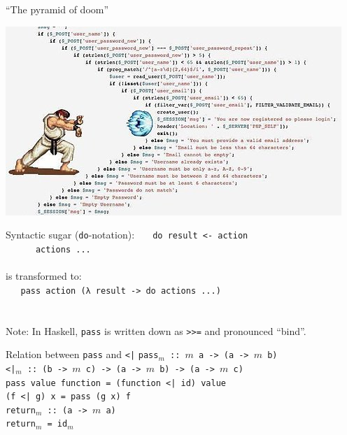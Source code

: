 \documentclass{beamer}
\begin{document}
\begin{frame}{``The pyramid of doom''}
  \begin{center}
    \includegraphics[height=0.7\paperheight]{ryu.jpg}
  \end{center}
\end{frame}


\begin{frame}{Syntactic sugar (\texttt{do}-notation):}
  \texttt{
    \ \ do result <- action \\
    \ \ \ \ \ \ actions  ... \\
  } \ \\ \pause
  is transformed to: \\ \pause
  \texttt{
    \ \ pass action (λ result -> do actions ...) \\
  } \ \\  \pause
  \ \\
  Note: In Haskell, \texttt{pass} is written down as
  \texttt{>>=} and pronounced ``bind''.
\end{frame}

\begin{frame}{Relation between \texttt{pass} and \texttt{<|}}
  \pause
  \texttt{pass$_m$ :: $m$ a -> (a -> $m$ b)} \\ \pause
  \texttt{<|$_m$ ::\ (b -> $m$ c) -> (a -> $m$ b) -> (a -> $m$ c)} \\ \pause
  \texttt{pass value function = (function <| id) value} \\ \pause
  \texttt{(f <| g) x = pass (g x) f} \\ \pause
  \texttt{return$_m$ :: (a -> $m$ a)} \\ \pause
  \texttt{return$_m$ = id$_m$}
\end{frame}
\end{document}
